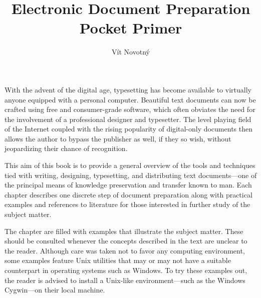 \documentclass[
  a5paper,10pt,           %
  dvipsnames              %
]{book}
\begin{document}
\frontmatter
\title{Electronic Document Preparation\\Pocket Primer}
\author{Vít Novotný}
\maketitle
\tableofcontents
\mainmatter
{}
With the advent of the digital age, typesetting has become available to
virtually anyone equipped with a personal computer. Beautiful text documents can
now be crafted using free and consumer-grade software, which often obviates the
need for the involvement of a professional designer and typesetter. The level
playing field of the Internet coupled with the rising popularity of digital-only
documents then allows the author to bypass the publisher as well, if they so
wish, without jeopardizing their chance of recognition.

This aim of this book is to provide a general overview of the tools and
techniques tied with writing, designing, typesetting, and distributing text
documents---one of the principal means of knowledge preservation and transfer
known to man. Each chapter describes one discrete step of document preparation
along with practical examples and references to literature for those interested
in further study of the subject matter.

The chapter are filled with examples that illustrate the subject matter. These
should be consulted whenever the concepts described in the text are unclear to
the reader. Although care was taken not to favor any computing environment,
some examples feature Unix utilities that may or may not have a suitable
counterpart in operating systems such as Windows. To try these examples out, the
reader is advised to install a Unix-like environment---such as the Windows
Cygwin---on their local machine.






\backmatter

\printbibliography[heading=bibintoc]

\printacronyms[heading=none]

\cleardoublepage
\def\index#1{} %
\printindex    %
\end{document}
